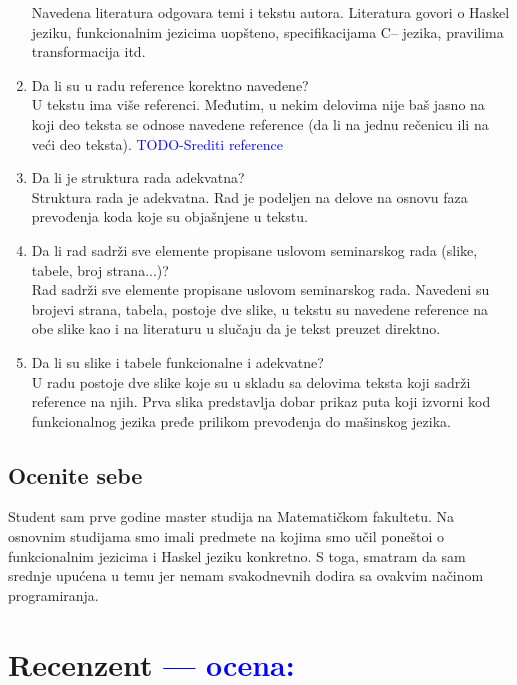 \documentclass[a4paper]{report}
\newcommand{\odgovor}[1]{\textcolor{blue}{#1}}
\begin{document}
\begin{enumerate}
Navedena literatura odgovara temi i tekstu autora. Literatura govori o Haskel jeziku, funkcionalnim jezicima uopšteno, specifikacijama C-- jezika, pravilima transformacija itd. 
\item Da li su u radu reference korektno navedene?\\
U tekstu ima više referenci. Međutim, u nekim delovima nije baš jasno na koji deo teksta se odnose navedene reference (da li na jednu rečenicu ili na veći deo teksta).
\odgovor{TODO-Srediti reference}
\item Da li je struktura rada adekvatna?\\
Struktura rada je adekvatna. Rad je podeljen na delove na osnovu faza prevođenja koda koje su objašnjene u tekstu.
\item Da li rad sadrži sve elemente propisane uslovom seminarskog rada (slike, tabele, broj strana...)?\\
Rad sadrži sve elemente propisane uslovom seminarskog rada. Navedeni su brojevi strana, tabela, postoje dve slike, u tekstu su navedene reference na obe slike kao i na literaturu u slučaju da je tekst preuzet direktno.
\item Da li su slike i tabele funkcionalne i adekvatne?\\
U radu postoje dve slike koje su u skladu sa delovima teksta koji sadrži reference na njih. Prva slika predstavlja dobar prikaz puta koji izvorni kod funkcionalnog jezika pređe prilikom prevođenja do mašinskog jezika.
\end{enumerate}

\section{Ocenite sebe}
Student sam prve godine master studija na Matematičkom fakultetu. Na osnovnim studijama smo imali predmete na kojima smo učil poneštoi o funkcionalnim jezicima i Haskel jeziku konkretno. S toga, smatram da sam srednje upućena u temu jer nemam svakodnevnih dodira sa ovakvim načinom programiranja.


\chapter{Recenzent \odgovor{--- ocena:} }
\end{document}
